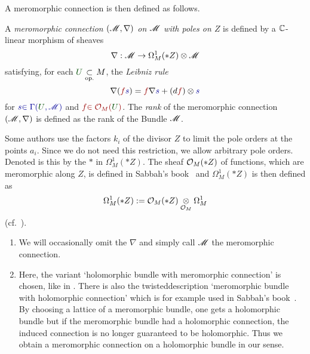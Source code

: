 A meromorphic connection is then defined as follows.
\begin{defn}\label{defn:mercon}
  \def\myU{\textcolor{green!30!black}{U}}
  \def\mys{\textcolor{blue!60!black}{s}}
  \def\myf{\textcolor{red!60!black}{f}}
  A \emph{meromorphic connection $(\mathscr{M},\nabla)$ on $\mathscr{M}$ with poles on $Z$}
  is defined by a $\mathbb{C}$-linear morphism of sheaves
  \[
    \nabla:\mathscr{M}\to\Omega_M^1(*Z)\otimes\mathscr{M}
  \]
  satisfying, for each $\myU\underset{\text{op.}}{\subset} M$, the
  \emph{Leibniz rule}
    \[
      \nabla(\myf\mys)=\myf\nabla\mys+(d\myf)\otimes\mys
    \]
  for $\mys\textcolor{blue!60!black}{\in\Gamma(\myU,\sM)}$ and
  $\myf\textcolor{red!60!black}{\in\cO_M(\myU)}$.
  The \emph{rank} of the meromorphic connection $(\mathscr{M},\nabla)$ is defined as
  the rank of the Bundle $\mathscr{M}$.
  \begin{s-rem}
    Some authors use the factors $k_i$ of the divisor $Z$ to limit the pole
    orders at the points $a_i$. Since we do not need this restriction, we allow
    arbitrary pole orders. Denoted is this by the $*$ in $\Omega_M^1(*Z)$.
    The sheaf $\mathcal{O}_M(*Z)$ of functions, which are meromorphic along $Z$, is
    defined in Sabbah's book~\cite[Sec.0.8]{sabbah2007isomonodromic} and
    $\Omega_M^1(*Z)$ is then defined as
    \[
      \Omega_M^1(*Z):=\mathcal{O}_M(*Z)\underset{\mathcal{O}_M}\otimes\Omega_M^1
    \]
     (cf.\
    \cite[Sec.0.9.b]{sabbah2007isomonodromic}).
  \end{s-rem}
\end{defn}
\begin{rem}
  \begin{enumerate}
    \item We will occasionally omit the $\nabla$ and simply call $\mathscr{M}$ the
      meromorphic connection.
    \item Here, the variant `holomorphic bundle with meromorphic connection' is
      chosen, like in \cite{boalch}.
      There is also the twisted description `meromorphic
      bundle with holomorphic connection' which is for example used in
      Sabbah's book~\cite{sabbah2007isomonodromic}.
      \\By choosing a lattice of a meromorphic bundle, one gets a holomorphic
      bundle but if the meromorphic bundle had a holomorphic connection, the
      induced connection \rewrite{on the lattice} is no longer guaranteed to be
      holomorphic.
      Thus we obtain a meromorphic connection on a holomorphic bundle in our
      sense.
  \end{enumerate}
\end{rem}

